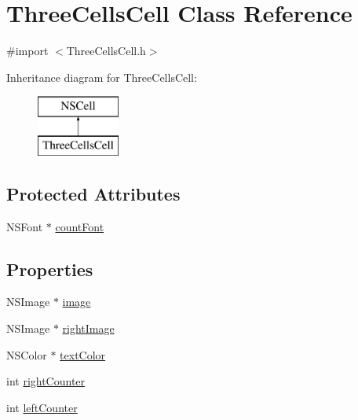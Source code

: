 \hypertarget{interface_three_cells_cell}{\section{Three\-Cells\-Cell Class Reference}
\label{interface_three_cells_cell}
}


{\ttfamily \#import $<$Three\-Cells\-Cell.\-h$>$}

Inheritance diagram for Three\-Cells\-Cell\-:\begin{figure}[H]
\begin{center}
\leavevmode
\includegraphics[height=2.000000cm]{interface_three_cells_cell}
\end{center}
\end{figure}
\subsection*{Protected Attributes}
\begin{DoxyCompactItemize}
\item 
N\-S\-Font $\ast$ \hyperlink{interface_three_cells_cell_a9232f4ec913a96525d7e019cd091b6c2}{count\-Font}
\end{DoxyCompactItemize}
\subsection*{Properties}
\begin{DoxyCompactItemize}
\item 
N\-S\-Image $\ast$ \hyperlink{interface_three_cells_cell_a8afbad09fa586e1edd2f83c3a54f19a4}{image}
\item 
N\-S\-Image $\ast$ \hyperlink{interface_three_cells_cell_a1d11e11238587ad7933fb473fbe87d11}{right\-Image}
\item 
N\-S\-Color $\ast$ \hyperlink{interface_three_cells_cell_ac8dfc097540a36e87adbec356c355a7c}{text\-Color}
\item 
int \hyperlink{interface_three_cells_cell_aa80e8e5c5f66203731a6d182c9085ad8}{right\-Counter}
\item 
int \hyperlink{interface_three_cells_cell_ad567191a15d8ded89bffd58def2c8502}{left\-Counter}
\end{DoxyCompactItemize}


